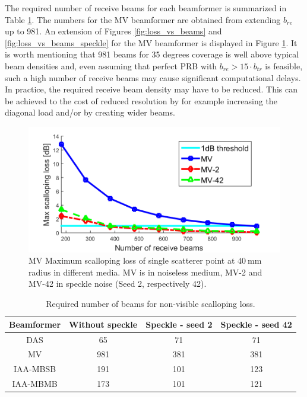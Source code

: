 The required number of receive beams for each beamformer is summarized in Table \ref{table:num_beams}. The numbers for the MV beamformer are obtained from extending $b_{re}$ up to 981. An extension of Figures \ref{fig:loss_vs_beams} and \ref{fig:loss_vs_beams_speckle} for the MV beamformer is displayed in Figure \ref{fig:loss_vs_beams_ext}.
It is worth mentioning that 981 beams for 35 degrees coverage is well above typical beam densities and, even assuming that perfect PRB with $b_{re} > 15 \cdot b_{tr}$ is feasible, such a high number of receive beams may cause significant computational delays.
In practice, the required receive beam density may have to be reduced. This can be achieved to the cost of reduced resolution by for example increasing the diagonal load and/or by creating wider beams.

\begin{figure}[ht]
    \centering
        \includegraphics[width=\linewidth]{./images/results/1/loss_vs_beams_ext.png}
	\caption{MV Maximum scalloping loss of single scatterer point at $40~$mm radius in different media. MV is in noiseless medium, MV-2 and MV-42 in speckle noise (Seed 2, respectively 42).}
	\label{fig:loss_vs_beams_ext}
\end{figure}

\begin{table}[!ht]
\centering
\begin{tabular}{| c | c | c | c |}
  \hline
  Beamformer &   Without speckle   &   Speckle - seed 2 &   Speckle - seed 42 \\
  \hline
  DAS       &   65      &   71  &   71   \\
  MV        &   981     &   381  &   381 \\
  IAA-MBSB  &   191     &   101  &   123  \\
  IAA-MBMB  &   173     &   101 &   121  \\
  \hline
 \end{tabular}
\caption{Required number of beams for non-visible scalloping loss.}
\label{table:num_beams}
\end{table}

